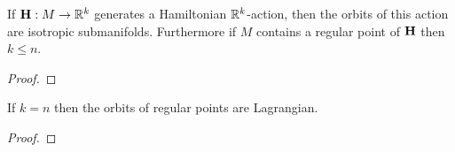\begin{lem}
    If $\mathbf{H}:M\to\mathbb{R}^k$ generates a Hamiltonian $\mathbb{R}^k$-action, then the orbits of this action are isotropic submanifolds.
    Furthermore if $M$ contains a regular point of $\mathbf{H}$ then $k\le n$.
\end{lem}

\begin{proof}
\end{proof}

\begin{cor}
    If $k=n$ then the orbits of regular points are Lagrangian.
\end{cor}

\begin{proof}
\end{proof}